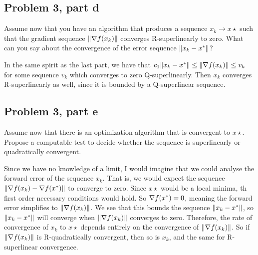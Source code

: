 \newpage
\subsection{Problem 3, part d}
Assume now that you have an algorithm that produces a sequence $x_k \rightarrow x\star$ such that the gradient sequence $\norm{\nabla f(x_k)}$ converges R-superlinearly to zero. What can you say about the convergence of the error sequence $\norm{x_k - x^{*}}$?
\partbreak
\begin{solution}

    In the same spirit as the last part, we have that $c_1\norm{x_k - x^{*}} \leq \norm{\nabla f(x_k)} \leq v_k$ for some sequence $v_k$ which converges to zero Q-superlinearly. Then $x_k$ converges R-superlinearly as well, since it is bounded by a Q-superlinear sequence.  
\end{solution}

\newpage
\subsection{Problem 3, part e}
Assume now that there is an optimization algorithm that is convergent to $x\star$. Propose a computable test to decide whether the sequence is superlinearly or quadratically convergent.
\partbreak
\begin{solution}

    Since we have no knowledge of a limit, I would imagine that we could analyse the forward error of the sequence $x_k$. That is, we would expect the sequence $\norm{\nabla f(x_k) - \nabla f(x^{*})}$ to converge to zero. Since $x\star$ would be a local minima, th first order necessary conditions would hold. So $\nabla f(x^{*}) = 0$, meaning the forward error simplifies to $\norm{\nabla f(x_k)}$. We see that this bounds the sequence $\norm{x_k - x^{*}}$, so $\norm{x_k - x^{*}}$ will converge when $\norm{\nabla f(x_k)}$ converges to zero. Therefore, the rate of convergence of $x_k$ to $x\star$ depends entirely on the convergence of $\norm{\nabla f(x_k)}$. So if $\norm{\nabla f(x_k)}$ is R-quadratically convergent, then so is $x_k$, and the same for R-superlinear convergence.
\end{solution}
